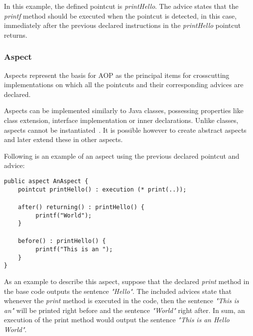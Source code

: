 \documentclass{template}
\begin{document}
In this example, the defined pointcut is \textit{printHello}. The advice states that the \textit{printf} method should be executed when the pointcut is detected, in this case, immediately after the previous declared instructions in the \textit{printHello} pointcut returns.

\subsubsection{Aspect}

Aspects represent the basis for AOP as the principal items for crosscutting implementations on which all the pointcuts and their corresponding advices are declared. 

Aspects can be implemented similarly to Java classes, possessing properties like class extension, interface implementation or inner declarations. Unlike classes, aspects cannot be instantiated~\cite{Kiselev2002}. It is possible however to create abstract aspects and later extend these in other aspects.

Following is an example of an aspect using the previous declared pointcut and advice:

\verb!public aspect AnAspect {!\\
\verb!    pointcut printHello() : execution (* print(..));!\\\\
\verb!    after() returning() : printHello() {!\\
\verb!         printf("World");!\\
\verb!    }!\\\\
\verb!    before() : printHello() {!\\
\verb!         printf("This is an ");!\\
\verb!    }!\\
\verb!}!

As an example to describe this aspect, suppose that the declared \textit{print} method in the base code outputs the sentence \textit{"Hello"}. The included advices state that whenever the \textit{print} method is executed in the code, then the sentence \textit{"This is an"} will be printed right before and the sentence \textit{"World"} right after. In sum, an execution of the print method would output the sentence \textit{"This is an Hello World"}.

\end{document}
